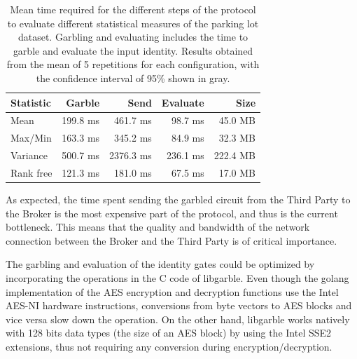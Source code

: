 

\begin{table}
    \begin{tabular}{l*{3}{r}r}
    \textbf{Statistic}  & \textbf{Garble} & \textbf{Send} & \textbf{Evaluate} & \textbf{Size} \\
    \hline
    Mean       & 199.8 ms & 461.7 ms & 98.7  ms & 45.0 MB \\
    Max/Min    & 163.3 ms & 345.2 ms & 84.9  ms & 32.3 MB \\
    Variance   & 500.7 ms & 2376.3 ms & 236.1 ms & 222.4 MB \\
    \hline
    Rank free  & 121.3 ms & 181.0 ms & 67.5 ms & 17.0 MB \\
    \end{tabular}
    \caption{Mean time required for the different steps of the protocol to
      evaluate different statistical measures of the parking lot dataset.
      Garbling and evaluating includes the time to garble and evaluate the
      input identity.  Results obtained from the mean of 5 repetitions for each
      configuration, with the confidence interval of 95\% shown in gray.}
    \label{stats-times}
\end{table}




As expected, the time spent sending the garbled circuit from the Third Party to
the Broker is the most expensive part of the protocol, and thus is the current
bottleneck.  This means that the quality and bandwidth of the network
connection between the Broker and the Third Party is of critical importance.

The garbling and evaluation of the identity gates could be optimized by
incorporating the operations in the C code of libgarble.  Even though the
golang implementation of the AES encryption and decryption functions use the
Intel AES-NI hardware instructions, conversions from byte vectors to AES blocks
and vice versa slow down the operation.  On the other hand, libgarble works
natively with 128 bits data types (the size of an AES block) by using the Intel
SSE2 extensions, thus not requiring any conversion during
encryption/decryption.
